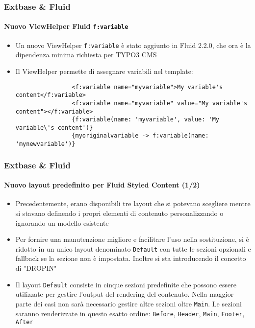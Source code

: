 \begin{frame}[fragile]
	\frametitle{Extbase \& Fluid}
	\framesubtitle{Nuovo ViewHelper Fluid \texttt{f:variable}}

	\begin{itemize}

		\item Un nuovo ViewHelper \texttt{f:variable} è stato aggiunto in Fluid 2.2.0,
			che ora è la dipendenza minima richiesta per TYPO3 CMS

		\item Il ViewHelper permette di assegnare variabili nel template:

			\begin{lstlisting}
				<f:variable name="myvariable">My variable's content</f:variable>
				<f:variable name="myvariable" value="My variable's content"></f:variable>
				{f:variable(name: 'myvariable', value: 'My variable\'s content')}
				{myoriginalvariable -> f:variable(name: 'mynewvariable')}
			\end{lstlisting}

	\end{itemize}

\end{frame}


\begin{frame}[fragile]
	\frametitle{Extbase \& Fluid}
	\framesubtitle{Nuovo layout predefinito per Fluid Styled Content (1/2)}

	\begin{itemize}
		\item Precedentemente, erano disponibili tre layout che si potevano scegliere
			mentre si stavano definendo i propri elementi di contenuto personalizzando o ignorando un modello esistente
		
		\item Per fornire una manutenzione migliore e facilitare l'uso nella sostituzione,
			si è ridotto in un unico layout denominato \texttt{Default} con tutte le
			sezioni opzionali e fallback se la sezione non è impostata. Inoltre si sta 
			introducendo il concetto di "DROPIN"

		\item Il layout \texttt{Default} consiste in cinque sezioni predefinite
			che possono essere utilizzate per gestire l'output del rendering del contenuto.
			Nella maggior parte dei casi non sarà necessario gestire altre sezioni oltre
			\texttt{Main}. Le sezioni saranno renderizzate in questo esatto ordine:
			\texttt{Before}, \texttt{Header}, \texttt{Main}, \texttt{Footer}, \texttt{After}
	\end{itemize}

\end{frame}

